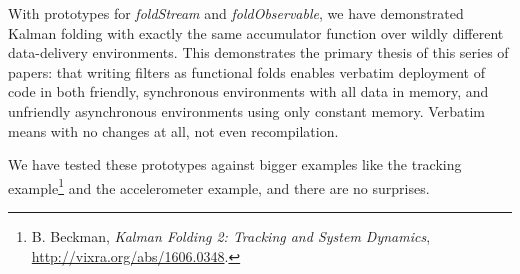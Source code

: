 \documentclass[10pt,oneside,x11names]{article}
\begin{document}
With prototypes for \emph{foldStream} and \emph{foldObservable}, we have demonstrated
Kalman folding with exactly the same accumulator function over wildly different
data-delivery environments. This demonstrates the primary thesis of this series
of papers: that writing filters as functional folds enables verbatim deployment
of code in both friendly, synchronous environments with all data in memory, and
unfriendly asynchronous environments using only constant memory. Verbatim means
with no changes at all, not even recompilation. 

We have tested these prototypes against bigger
examples like the tracking example\footnote{B. Beckman, \emph{Kalman Folding 2: Tracking and System Dynamics}, \url{http://vixra.org/abs/1606.0348}.} and the accelerometer
example,\footnotemark[1]{} and there are no surprises.
\end{document}
